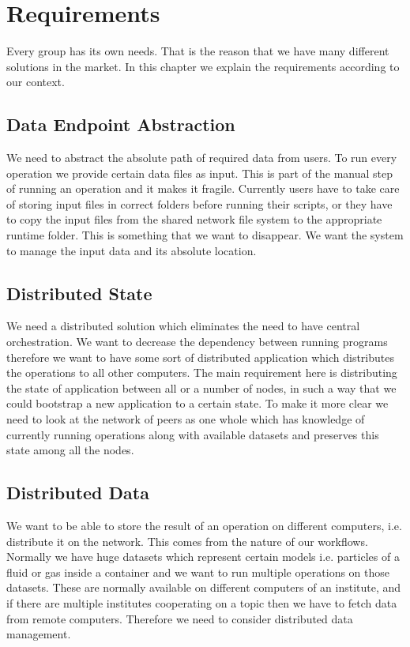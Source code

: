 \chapter{Requirements}
\label{cha:requirements}

Every group has its own needs. That is the reason that we have many different solutions in the market.
In this chapter we explain the requirements according to our context.


\section{Data Endpoint Abstraction}
We need to abstract the absolute path of required data from users. To run every operation
we provide certain data files as input. This is part of the manual step of running an operation and
it makes it fragile. Currently users have to take care of storing input files in correct folders before
running their scripts, or they have to copy the input files from the shared network file system to the
appropriate runtime folder. This is something that we want to disappear. We want the system to 
manage the input data and its absolute location.

\section{Distributed State}
We need a distributed solution which eliminates the need to have central orchestration.
We want to decrease the dependency between running programs therefore we want to have 
some sort of distributed application which distributes the operations to all other computers.
The main requirement here is distributing the state of application between all or a number of nodes, 
in such a way that we could bootstrap a new application to a certain state. To make it more clear
we need to look at the network of peers as one whole which has knowledge of currently running
operations along with available datasets and preserves this state among all the nodes.

\section{Distributed Data}
We want to be able to store the result of an operation on different computers, i.e. distribute it on the network.
This comes from the nature of our workflows. Normally we have huge datasets which represent certain models i.e.
particles of a fluid or gas inside a container and we want to run multiple operations on those datasets. These
are normally available on different computers of an institute, and if there are multiple institutes cooperating
on a topic then we have to fetch data from remote computers. Therefore we need to consider distributed data management.

